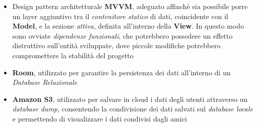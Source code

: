 \documentclass{article}
\begin{document}
\begin{itemize}
    \renewcommand{\labelitemi}{-}
    \item Design pattern architetturale \textbf{MVVM}, adeguato affinchè sia possibile porre un layer aggiuntivo tra il \textit{contenitore statico} di dati, coincidente con il \textbf{Model}, e la sezione \textit{attiva}, definita all'interno della \textbf{View}. In questo modo sono ovviate \textit{dipendenze funzionali}, che potrebbero possedere un effetto distruttivo sull'entità sviluppate, dove piccole modifiche potrebbero compromettere la stabilità del progetto
    \item \textbf{Room}, utilizzato per garantire la persistenza dei dati all'interno di un \textit{Database Relazionale}
    \item \textbf{Amazon S3}, utilizzato per salvare in cloud i dati degli utenti attraverso un \textit{database dump}, consentendo la condivisione dei dati salvati sul \textit{database locale} e permettendo di visualizzare i dati condivisi dagli amici
\end{itemize}

\newpage
\end{document}
